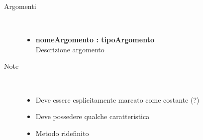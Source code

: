 \begin{description}
\begin{description}
		\begin{description}
			\item[Argomenti] \hfill \\
				\begin{itemize}
				
					\item \textbf{nomeArgomento : tipoArgomento			} \hfill \\
					Descrizione argomento
					
				\end{itemize}
			\item[Note] \hfill \\
			\begin{itemize}
					\item Deve essere esplicitamente marcato come costante (?)
					\item Deve possedere qualche caratteristica
					\item Metodo ridefinito
				\end{itemize}
		\end{description}
	\end{description}
	
	
	
\end{description}
